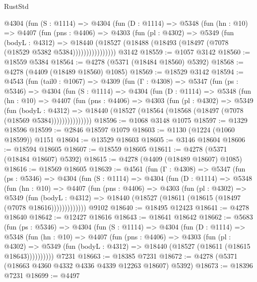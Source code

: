 \begin{lexlean}{RustStd}
\begin{coremodule}
          @4304
            (fun (S : @1114) =>
            @4304
              (fun (D : @1114) =>
              @5348
                (fun (hn : @10) =>
                @4407
                  (fun (pns : @4406) =>
                  @4303
                    (fun (pl : @4302) =>
                    @5349
                      (fun (bodyL : @4312) =>
                      @18440
                        (@18527 (@18488 (@18493 (@18497 (@7078 (@18529 @5382 @5384))))))))))))))))
    @3142
@18559 := @1057 @3142
@18560 := @18559 @5384
@18564 := @4278 (@5371 (@18484 @18560) @5392)
@18568 := @4278 (@4409 (@18489 @18560) @1085)
@18569 := @18529 @3142
@18594 := @4543
    (fun (tail0 : @1067) =>
    @4309
      (fun (Γ : @4308) =>
      @5347
        (fun (ps : @5346) =>
        @4304
          (fun (S : @1114) =>
          @4304
            (fun (D : @1114) =>
            @5348
              (fun (hn : @10) =>
              @4407
                (fun (pns : @4406) =>
                @4303
                  (fun (pl : @4302) =>
                  @5349
                    (fun (bodyL : @4312) =>
                    @18440 (@18527 (@18564 (@18568 (@18497 (@7078 (@18569 @5384)))))))))))))))
@18596 := @1068 @3148 @1075
@18597 := @1329 @18596
@18599 := @2846 @18597 @1079
@18603 := @1130 (@1224 (@1060 @18599)) @1151
@18604 := @13529 @18603
@18605 := @3146 @18604
@18606 := @18594 @18605
@18607 := @18559 @18605
@18611 := @4278 (@5371 (@18484 @18607) @5392)
@18615 := @4278 (@4409 (@18489 @18607) @1085)
@18616 := @18569 @18605
@18639 := @4561
    (fun (Γ : @4308) =>
    @5347
      (fun (ps : @5346) =>
      @4304
        (fun (S : @1114) =>
        @4304
          (fun (D : @1114) =>
          @5348
            (fun (hn : @10) =>
            @4407
              (fun (pns : @4406) =>
              @4303
                (fun (pl : @4302) =>
                @5349
                  (fun (bodyL : @4312) =>
                  @18440 (@18527 (@18611 (@18615 (@18497 (@7078 @18616)))))))))))))
    @9102
@18640 := @18495 @12423
@18641 := @4278 @18640
@18642 := @12427 @18616
@18643 := @18641 @18642
@18662 := @5683
    (fun (ps : @5346) =>
    @4304
      (fun (S : @1114) =>
      @4304
        (fun (D : @1114) =>
        @5348
          (fun (hn : @10) =>
          @4407
            (fun (pns : @4406) =>
            @4303
              (fun (pl : @4302) =>
              @5349 (fun (bodyL : @4312) => @18440 (@18527 (@18611 (@18615 @18643))))))))))
    @7231
@18663 := @18385 @7231
@18672 := @4278 (@5371 (@18663 @4360 @4332 @4336 @4339 @12263 @18607) @5392)
@18673 := @18396 @7231
@18699 := @4497

\end{coremodule}
\end{lexlean}
